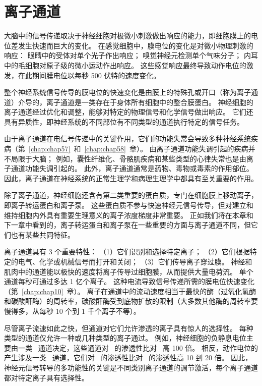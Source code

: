 \chapter{离子通道} \label{chap:chap8}

大脑中的信号传递取决于神经细胞对极微小刺激做出响应的能力，即细胞膜上的电位差发生快速而巨大的变化。
在感觉细胞中，膜电位的变化是对微小物理刺激的响应：
眼睛中的受体对单个光子作出响应；
嗅觉神经元检测单个气味分子；
内耳中的毛细胞对原子级的微小运动作出响应。
这些感觉响应最终导致动作电位的激发，在此期间膜电位以每秒 500 伏特的速度变化。


整个神经系统信号传导的膜电位的快速变化是由膜上的特殊孔或开口（称为离子通道）介导的，离子通道是一类存在于身体所有细胞中的整合膜蛋白。
神经细胞的离子通道经过优化和调整，能够对特定的物理信号和化学信号做出响应。
它们还具有异质性，即神经系统的不同部位有不同类型的通道执行特定的信号任务。


由于离子通道在电信号传递中的关键作用，它们的功能失常会导致多种神经系统疾病（第~\ref{chap:chap57}~和~\ref{chap:chap58}~章）。
由离子通道功能失调引起的疾病并不局限于大脑；
例如，囊性纤维化、骨骼肌疾病和某些类型的心律失常也是由离子通道功能失调引起的。
此外，离子通道通常是药物、毒物或毒素的作用部位。
因此，离子通道在神经系统的正常生理学和病理生理学中都具有至关重要的作用。


除了离子通道，神经细胞还含有第二类重要的蛋白质，专门在细胞膜上移动离子，即离子转运蛋白和离子泵。
这些蛋白质不参与快速神经元信号传导，但对建立和维持细胞内外具有重要生理意义的离子浓度梯度非常重要。
正如我们将在本章和下一章中看到的，离子转运蛋白和离子泵在一些重要的方面与离子通道不同，但它们也有某些共同特征。


离子通道具有 3 个重要特性：
（1）它们识别和选择特定离子；
（2）它们根据特定的电气、化学或机械信号而打开和关闭；
（3）它们传导离子穿过膜。
神经和肌肉中的通道能以极快的速度将离子传导过细胞膜，从而提供大量电荷流。
单个通道每秒可通过多达 1 亿个离子。
这种电流导致信号传递所需的膜电位快速变化（第~\ref{chap:chap10}~章）。
离子在通道中的流动速度相当于最快的酶（过氧化氢酶和碳酸酐酶）的周转率，碳酸酐酶受到底物扩散的限制（大多数其他酶的周转率要慢得多，从每秒 10 个到 1 千个离子不等）。


尽管离子流速如此之快，但通道对它们允许渗透的离子具有惊人的选择性。
每种类型的通道仅允许一种或几种类型的离子通过。
例如，神经细胞的负静息电位主要由一类~ 通道决定，这些通道对~ 的渗透性比对~ 高 100 倍。
相反，动作电位的产生涉及一类~ 通道，它们对~ 的渗透性比对~ 的渗透性高 10 到 20 倍。
因此，神经元信号转导的多功能性的关键是不同类别离子通道的调节激活，每个离子通道都对特定离子具有选择性。


